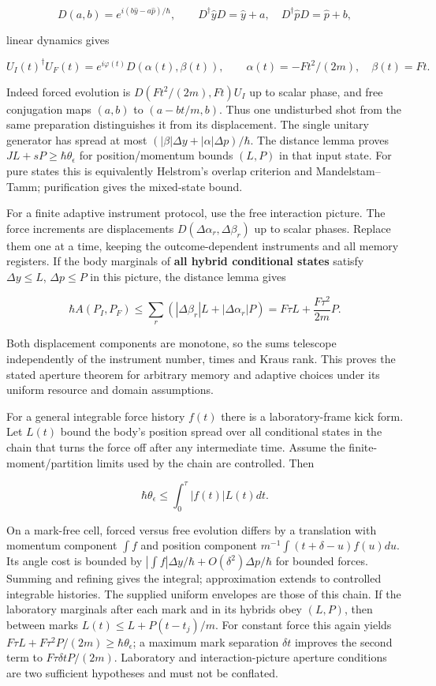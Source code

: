 \documentclass[11pt,a4paper]{article}
\begin{document}
\[D(a,b)=e^{i(b\hat y-a\hat p)/\hbar},\qquad
D^\dagger\hat yD=\hat y+a,\quad D^\dagger\hat pD=\hat p+b,\]

linear dynamics gives

\[U_I(t)^\dagger U_F(t)=e^{i\varphi(t)}D(\alpha(t),\beta(t)),\qquad
\alpha(t)=-Ft^2/(2m),\quad\beta(t)=Ft.\]

Indeed forced evolution is \(D(Ft^2/(2m),Ft)U_I\) up to scalar phase,
and free conjugation maps \((a,b)\) to \((a-bt/m,b)\). Thus one
undisturbed shot from the same preparation distinguishes it from its
displacement. The single unitary generator has spread at most
\((|\beta|\Delta y+|\alpha|\Delta p)/\hbar\). The distance lemma proves
\(JL+sP\ge\hbar\theta_\epsilon\) for position/momentum bounds \((L,P)\)
in that input state. For pure states this is equivalently Helstrom's
overlap criterion and Mandelstam--Tamm; purification gives the
mixed-state bound.

For a finite adaptive instrument protocol, use the free interaction
picture. The force increments are displacements
\(D(\Delta\alpha_r,\Delta\beta_r)\) up to scalar phases. Replace them
one at a time, keeping the outcome-dependent instruments and all memory
registers. If the body marginals of \textbf{all hybrid conditional
states} satisfy \(\Delta y\le L\), \(\Delta p\le P\) in this picture,
the distance lemma gives

\[\hbar A(P_I,P_F)\le\sum_r(|\Delta\beta_r|L+|\Delta\alpha_r|P)
 =F\tau L+\frac{F\tau^2}{2m}P.\]

Both displacement components are monotone, so the sums telescope
independently of the instrument number, times and Kraus rank. This
proves the stated aperture theorem for arbitrary memory and adaptive
choices under its uniform resource and domain assumptions.

For a general integrable force history \(f(t)\) there is a
laboratory-frame kick form. Let \(L(t)\) bound the body's position
spread over all conditional states in the chain that turns the force off
after any intermediate time. Assume the finite-moment/partition limits
used by the chain are controlled. Then

\[\boxed{\hbar\theta_\epsilon\le\int_0^\tau|f(t)|L(t)dt.}\]

On a mark-free cell, forced versus free evolution differs by a
translation with momentum component \(\int f\) and position component
\(m^{-1}\int(t+\delta-u)f(u)du\). Its angle cost is bounded by
\(|\int f|\Delta y/\hbar+O(\delta^2)\Delta p/\hbar\) for bounded forces.
Summing and refining gives the integral; approximation extends to
controlled integrable histories. The supplied uniform envelopes are
those of this chain. If the laboratory marginals after each mark and in
its hybrids obey \((L,P)\), then between marks \(L(t)\le L+P(t-t_j)/m\).
For constant force this again yields
\(F\tau L+F\tau^2P/(2m)\ge\hbar\theta_\epsilon\); a maximum mark
separation \(\delta t\) improves the second term to
\(F\tau\delta t P/(2m)\). Laboratory and interaction-picture aperture
conditions are two sufficient hypotheses and must not be conflated.
\end{document}
